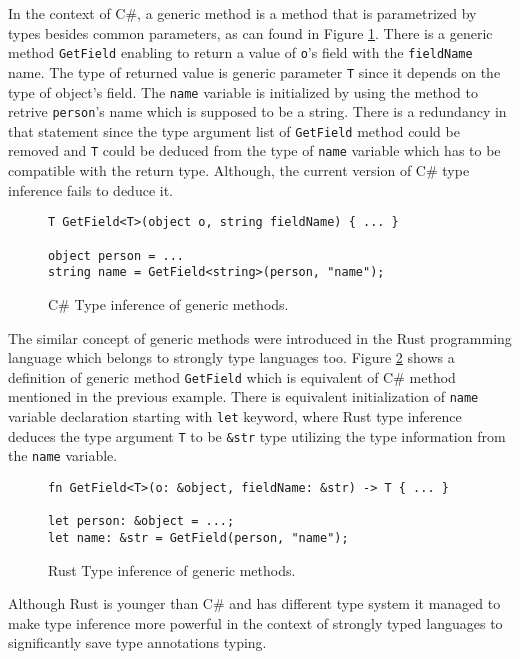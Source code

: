 In the context of C\#, a generic method is a method that is parametrized by types besides common parameters, as can found in Figure \ref{img03:csharp_gen_meth}.
There is a generic method \texttt{GetField} enabling to return a value of \texttt{o}'s field with the \texttt{fieldName} name.
The type of returned value is generic parameter \texttt{T} since it depends on the type of object's field.
The \texttt{name} variable is initialized by using the method to retrive \texttt{person}'s name which is supposed to be a string.
There is a redundancy in that statement since the type argument list of \texttt{GetField} method could be removed and \texttt{T} could be deduced from the type of \texttt{name} variable which has to be compatible with the return type.
Although, the current version of C\# type inference fails to deduce it.
\begin{figure}
\begin{lstlisting}[style=csharp]
T GetField<T>(object o, string fieldName) { ... }

object person = ...
string name = GetField<string>(person, "name");
\end{lstlisting}
\caption{C\# Type inference of generic methods.}
\label{img03:csharp_gen_meth}
\end{figure}
\par
The similar concept of generic methods were introduced in the Rust \cite{online:rust} programming language which belongs to strongly type languages too.
Figure \ref{img04:rust_gen_meth} shows a definition of generic method \texttt{GetField} which is equivalent of C\# method mentioned in the previous example.
There is equivalent initialization of \texttt{name} variable declaration starting with \texttt{let} keyword, where Rust type inference deduces the type argument \texttt{T} to be \texttt{\&str} type utilizing the type information from the \texttt{name} variable.
\begin{figure}[h]
\begin{lstlisting}[style=csharp]
fn GetField<T>(o: &object, fieldName: &str) -> T { ... }

let person: &object = ...;
let name: &str = GetField(person, "name");
\end{lstlisting}
\caption{Rust Type inference of generic methods.}
\label{img04:rust_gen_meth}
\end{figure}
\par
Although Rust is younger than C\# and has different type system it managed to make type inference more powerful in the context of strongly typed languages to significantly save type annotations typing.

